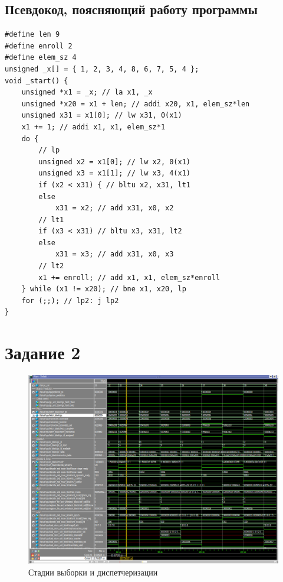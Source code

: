 \documentclass{article}
\begin{document}
\subsection{Псевдокод, поясняющий работу программы}
\begin{lstlisting}[style=lst, caption=Псевдокод]
#define len 9
#define enroll 2
#define elem_sz 4
unsigned _x[] = { 1, 2, 3, 4, 8, 6, 7, 5, 4 };
void _start() {
    unsigned *x1 = _x; // la x1, _x
    unsigned *x20 = x1 + len; // addi x20, x1, elem_sz*len
    unsigned x31 = x1[0]; // lw x31, 0(x1)
    x1 += 1; // addi x1, x1, elem_sz*1
    do {
        // lp
        unsigned x2 = x1[0]; // lw x2, 0(x1)
        unsigned x3 = x1[1]; // lw x3, 4(x1)
        if (x2 < x31) { // bltu x2, x31, lt1
        else
            x31 = x2; // add x31, x0, x2
        // lt1
        if (x3 < x31) // bltu x3, x31, lt2
        else
            x31 = x3; // add x31, x0, x3
        // lt2
        x1 += enroll; // add x1, x1, elem_sz*enroll
    } while (x1 != x20); // bne x1, x20, lp
    for (;;); // lp2: j lp2
}
\end{lstlisting}

\clearpage\section{Задание 2}
\begin{figure}[h]
	\centering
	\includegraphics[scale=0.4]{tools/task2.png}
	\caption{Стадии выборки и диспетчеризации}
\end{figure}
\end{document}
